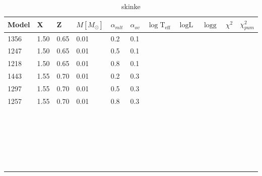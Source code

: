 \begin{table}[htbp]
  \caption{skinke}
  \label{bestchi_m2}
  \begin{tabular}{lllllllllll}
    \toprule
    Model & X & Z  & $M[M_\odot]$ & $\alpha_{mlt}$ & $\alpha_{ov}$ & $\log \text{T}_\text{eff}$  & $\log \text{L}$  & $\log \text{g}$ & $\chi^2$ & $\chi^2_{pum}$\\
    \midrule
          1356 & 1.50 & 0.65  & 0.01  & 0.2  & 0.1  &  &  &  &  &  \\
          1247 & 1.50 & 0.65  & 0.01  & 0.5  & 0.1 &  &  &  &  &  \\
          1218 & 1.50 & 0.65  & 0.01  & 0.8  & 0.1 &  &  &  &  &  \\
          1443 & 1.55 & 0.70 & 0.01  & 0.2  & 0.3  &  &  &  &  &  \\
          1297 & 1.55 & 0.70 & 0.01   & 0.5  & 0.3  &  &  &  &  &  \\
          1257 & 1.55 & 0.70  & 0.01  & 0.8  & 0.3 &  &  &  &  &  \\
         
          &  &  &  &  &  &  &  &  &  &  \\
          &  &  &  &  &  &  &  &  &  &  \\
          &  &  &  &  &  &  &  &  &  &  \\
          &  &  &  &  &  &  &  &  &  &  \\
          &  &  &  &  &  &  &  &  &  &  \\
          &  &  &  &  &  &  &  &  &  &  \\
          &  &  &  &  &  &  &  &  &  &  \\
          &  &  &  &  &  &  &  &  &  &  \\
          &  &  &  &  &  &  &  &  &  &  \\
          &  &  &  &  &  &  &  &  &  &  \\
          &  &  &  &  &  &  &  &  &  &  \\
          &  &  &  &  &  &  &  &  &  &  \\
          &  &  &  &  &  &  &  &  &  &  \\
          &  &  &  &  &  &  &  &  &  &  \\
          &  &  &  &  &  &  &  &  &  &  \\
          &  &  &  &  &  &  &  &  &  &  \\
          &  &  &  &  &  &  &  &  &  &  \\
          &  &  &  &  &  &  &  &  &  &  \\
          &  &  &  &  &  &  &  &  &  &  \\
          &  &  &  &  &  &  &  &  &  &  \\
          &  &  &  &  &  &  &  &  &  &  \\
          &  &  &  &  &  &  &  &  &  &  \\
          &  &  &  &  &  &  &  &  &  &  \\
          &  &  &  &  &  &  &  &  &  &  \\
    \bottomrule
\end{tabular}
\end{table}

